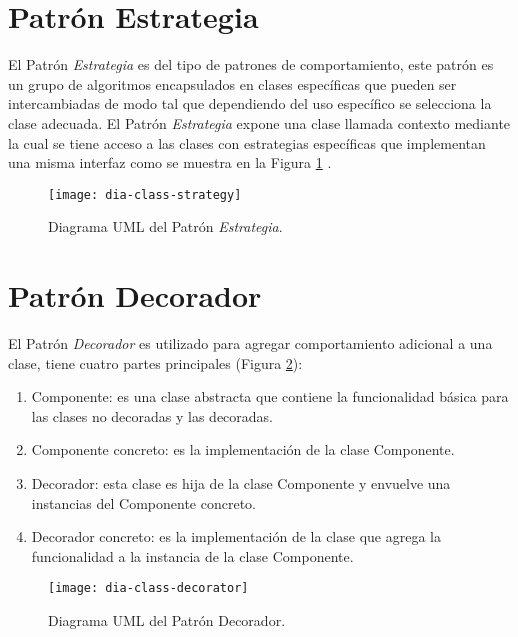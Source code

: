 \section{Patrón Estrategia}\label{sec:strategy}
El Patrón \textit{Estrategia} es del tipo de patrones de comportamiento, este patrón es un grupo de algoritmos encapsulados en clases específicas que pueden ser intercambiadas de modo tal que dependiendo del uso específico se selecciona la clase adecuada. El Patrón \textit{Estrategia} expone una clase llamada contexto mediante la cual se tiene acceso a las clases con estrategias específicas que implementan una misma interfaz como se muestra en la Figura \ref{fig:dia-class-strategy} \cite{DesignPatternsLasater, DesignPatterns}.

\begin{figure}[h]
  \centering
  \texttt{[image: dia-class-strategy]}
  \caption{Diagrama UML del Patrón \textit{Estrategia}\cite{DesignPatternsLasater}.}
  \label{fig:dia-class-strategy}
\end{figure}

\section{Patrón Decorador}\label{sec:decorator}
El Patrón \textit{Decorador} es utilizado para agregar comportamiento adicional a una clase, tiene cuatro partes principales\cite{DesignPatternsLasater} (Figura \ref{fig:dia-class-decorator}):
\begin{enumerate}
  \item Componente: es una clase abstracta que contiene la funcionalidad básica para las clases no decoradas y las decoradas.
  \item Componente concreto: es la implementación de la clase Componente.
  \item Decorador: esta clase es hija de la clase Componente y envuelve una instancias del Componente concreto.
  \item Decorador concreto: es la implementación de la clase que agrega la funcionalidad a la instancia de la clase Componente.
\end{enumerate}

\begin{figure}[h]
  \centering
  \texttt{[image: dia-class-decorator]}
  \caption{Diagrama UML del Patrón Decorador\cite{DesignPatternsLasater}.}
  \label{fig:dia-class-decorator}
\end{figure}

